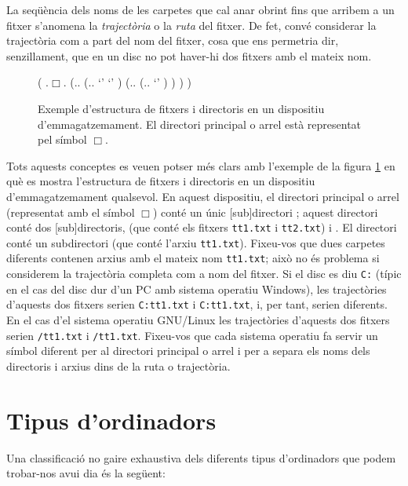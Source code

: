 La seqüència dels noms de les carpetes que cal anar obrint fins que
arribem a un fitxer s'anomena la \emph{trajectòria} o la \emph{ruta}
del fitxer.  De fet, convé considerar la trajectòria com a part del
nom del fitxer, cosa que ens permetria dir, senzillament, que en un
disc no pot haver-hi dos fitxers amb el mateix nom.  

\begin{figure}
\centering
\begin{parsetree}
    ( .{$\Box$}.
      (.{}.
         (.{}.
               `'
               `'
      )
         (.{}.
         (.{}.
              `'
         )
         )
      )
    )
\end{parsetree}
\caption{Exemple d'estructura de fitxers i directoris en un dispositiu
  d'emmagatzemament. El directori principal o arrel està
  representat pel símbol $\Box$.}\label{fg:fitxersdirs}
\end{figure}

Tots aquests conceptes es veuen potser més clars amb l'exemple de la
figura \ref{fg:fitxersdirs} en què es mostra l'estructura de fitxers i
directoris en un dispositiu d'emmagatzemament qualsevol. En aquest
dispositiu, el directori principal o arrel (representat amb el símbol
$\Box$) conté un únic [sub]directori ; aquest directori
conté dos [sub]directoris,  (que conté els fitxers
\texttt{tt1.txt} i \texttt{tt2.txt}) i .  El directori
 conté un subdirectori  (que conté l'arxiu
\texttt{tt1.txt}). Fixeu-vos que dues carpetes diferents contenen
arxius amb el mateix nom \texttt{tt1.txt}; això no és problema si
considerem la trajectòria completa com a nom del fitxer. Si el disc es
diu \texttt{C:} (típic en el cas del disc dur d'un PC amb sistema
operatiu Windows), les trajectòries d'aquests dos fitxers serien
\texttt{C:}\barra{}\barra{}\barra\texttt{tt1.txt} i
\texttt{C:}\barra{}\barra{}\barra{}\barra\texttt{tt1.txt},
i, per tant, serien diferents. En el cas d'el sistema operatiu
GNU/Linux les trajectòries d'aquests dos fitxers serien
\texttt{/}\texttt{tt1.txt} i
\texttt{/}\texttt{tt1.txt}. Fixeu-vos
que cada sistema operatiu fa servir un símbol diferent per al
directori principal o arrel i per a separa els noms dels directoris i
arxius dins de la ruta o trajectòria.

\section{Tipus d'ordinadors}
Una classificació no gaire exhaustiva dels diferents tipus
d'ordinadors que podem trobar-nos avui dia és la següent:

